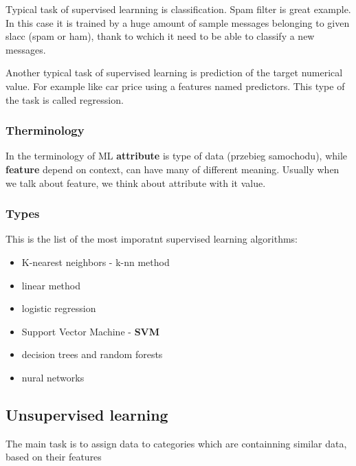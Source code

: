 \documentclass{article}
\begin{document}
    Typical task of supervised learnning is classification. Spam filter is great example. In this case it is trained by a huge amount of sample messages belonging to given slacc (spam or ham), thank to wchich it need to be able to classify a new messages.

    Another typical task of supervised learning is prediction of the target numerical value. For example like car price using a features named predictors. This type of the task is called regression.

    \subsubsection{Therminology}

    In the terminology of ML \textbf{attribute} is type of data (przebieg samochodu), while \textbf{feature} depend on context, can have many of different meaning. Usually when we talk about feature, we think about attribute with it value.

    \subsubsection{Types}
    This is the list of the most imporatnt supervised learning algorithms:
    \begin{itemize}
      \item K-nearest neighbors - k-nn method
      \item linear method
      \item logistic regression
      \item Support Vector Machine - \textbf{SVM}
      \item decision trees and random forests
      \item nural networks
    \end{itemize}
  
  \newpage

  \subsection{Unsupervised learning}

The main task is to assign data to categories which are containning similar data, based on their features
\end{document}
